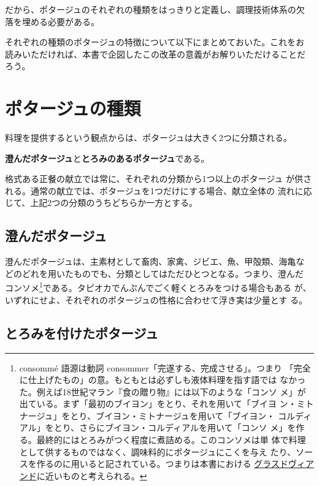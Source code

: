 だから、ポタージュのそれぞれの種類をはっきりと定義し、調理技術体系の欠
落を埋める必要がある。

それぞれの種類のポタージュの特徴について以下にまとめておいた。これをお
読みいただければ、本書で企図したこの改革の意義がお解りいただけることだ
ろう。

\hypertarget{classification-des-potages}{%
\section{ポタージュの種類}\label{classification-des-potages}}


料理を提供するという観点からは、ポタージュは大きく2つに分類される。

\textbf{澄んだポタージュ}と\textbf{とろみのあるポタージュ}である。

格式ある正餐の献立では常に、それぞれの分類から1つ以上のポタージュ
が供される。通常の献立では、ポタージュを1つだけにする場合、献立全体の
流れに応じて、上記2つの分類のうちどちらか一方とする。

\hypertarget{classification-potages-claires}{%
\subsection{澄んだポタージュ}\label{classification-potages-claires}}


澄んだポタージュは、主素材として畜肉、家禽、ジビエ、魚、甲殻類、海亀な
どのどれを用いたものでも、分類としてはただひとつとなる。つまり、澄んだ
コンソメ\footnote{consommé 語源は動詞
  consommer「完遂する、完成させる」。つまり
  「完全に仕上げたもの」の意。もともとは必ずしも液体料理を指す語では
  なかった。例えば18世紀マラン『食の贈り物』には以下のような「コンソ
  メ」が出ている。まず「最初のブイヨン」をとり、それを用いて「ブイヨ
  ン・ミトナージュ」をとり、ブイヨン・ミトナージュを用いて「ブイヨン・
  コルディアル」をとり、さらにブイヨン・コルディアルを用いて「コンソ
  メ」を作る。最終的にはとろみがつく程度に煮詰める。このコンソメは単
  体で料理として供するものではなく、調味料的にポタージュにこくを与え
  たり、ソースを作るのに用いると記されている。つまりは本書における
  \protect\hyperlink{glace-de-viande}{グラスドヴィアンド}に近いものと考えられる。}である。タピオカでんぷんでごく軽くとろみをつける場合もある
が、いずれにせよ、それぞれのポタージュの性格に合わせて浮き実は少量とす
る。

\hypertarget{classification-potages-lies}{%
\subsection{とろみを付けたポタージュ}\label{classification-potages-lies}}

